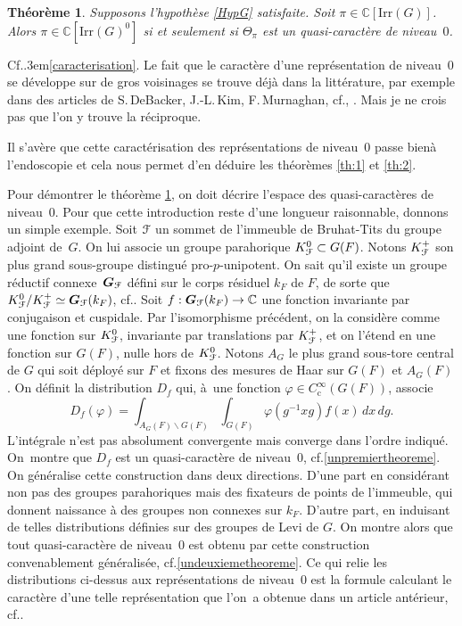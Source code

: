 \documentclass[11pt]{article}
\newcommand{\cf}{cf.\xspace}
\numberwithin{equation}{section}\providecommand{\og}{«\,}\providecommand{\fg}{\,»}
\let\mathcal \EuScript
\let\oldS\S
\renewcommand{\S}{\oldS\,}
\newcommand\Cf{Cf.\kern.3em}
\newcommand{\rc}{\mathrm{c}}
\newcommand{\Irr}{\mathrm{Irr}}
\newcommand{\bG}{\boldsymbol{G}}
\newcommand{\cF}{\mathcal{F}}
\newcommand{\CC}{\mathbb{C}}
\theoremstyle{plain}
\newtheorem{thm}{Théorème}
\theoremstyle{definition}
\begin{document}
\begin{thm}\label{th:3}
Supposons l'hypothèse \ref{HypG} satisfaite. Soit \hbox{$\pi\!\in\!\CC[\Irr(G)]$}. Alors $\pi\in \CC[\Irr(G)^0]$ si et seulement si $\Theta_{\pi}$ est un quasi-caractère de niveau~$0$.
\end{thm}

\Cf \ref{caracterisation}. Le fait que le caractère d'une représentation de niveau~$0$ se développe sur de gros voisinages se trouve déjà dans la littérature, par exemple dans des articles de S.\,DeBacker, J.-L.\,Kim, F.\,Murnaghan, \cf \cite[Th.\,3.5.2]{D}, \cite[Th.\,5.3.1]{KM}. Mais je ne crois pas que l'on y trouve la réciproque.

Il s'avère que cette caractérisation des représentations de niveau~$0$ \og passe bien\fg à l'endoscopie et cela nous permet d'en déduire les théorèmes \ref{th:1} et \ref{th:2}.

Pour démontrer le théorème \ref{th:3}, on doit décrire l'espace des quasi-caractères de niveau~$0$. Pour que cette introduction reste d'une longueur raisonnable, donnons un simple exemple. Soit $\cF$ un sommet de l'immeuble de Bruhat-Tits du groupe adjoint de~$G$. On lui associe un groupe parahorique $K_{\cF}^0\subset G(F)$. Notons $K_{\cF}^+$ son plus grand sous-groupe distingué pro-$p$-unipotent. On sait qu'il existe un groupe réductif connexe~$\bG_{\cF}$ défini sur le corps résiduel $k_{F}$ de $F$, de sorte que $K_{\cF}^0/K_{\cF}^+\simeq \bG_{\cF}(k_{F})$, \cf \cite[\S3.4]{T}. Soit $f:\bG_{\cF}(k_{F})\to \CC$ une fonction invariante par conjugaison et cuspidale. Par l'isomorphisme précédent, on la considère comme une fonction sur $K_{\cF}^0$, invariante par translations par $K_{\cF}^+$, et on l'étend en une fonction sur $G(F)$, nulle hors de $K_{\cF}^0$. Notons $A_{G}$ le plus grand sous-tore central de $G$ qui soit déployé sur $F$ et fixons des mesures de Haar sur $G(F)$ et $A_{G}(F)$. On définit la distribution $D_{f}$ qui, à~une fonction $\varphi\in C_{\rc}^{\infty}(G(F))$, associe\vspace*{-3pt}
\[
D_{f}(\varphi)=\int_{A_{G}(F)\backslash G(F)}\int_{G(F)}\varphi(g^{-1}xg)f(x)\,dx\,dg.
\]
L'intégrale n'est pas absolument convergente mais converge dans l'ordre indiqué. On~montre que $D_{f}$ est un quasi-caractère de niveau~$0$, \cf \ref{unpremiertheoreme}. On généralise cette construction dans deux directions. D'une part en considérant non pas des groupes parahoriques mais des fixateurs de points de l'immeuble, qui donnent naissance à des groupes non connexes sur $k_{F}$. D'autre part, en induisant de telles distributions définies sur des groupes de Levi de $G$. On montre alors que tout quasi-caractère de niveau~$0$ est obtenu par cette construction convenablement généralisée, \cf \ref{undeuxiemetheoreme}. Ce qui relie les distributions ci-dessus aux représentations de niveau~$0$ est la formule calculant le carac\-tère d'une telle représentation que l'on~a obtenue dans un article antérieur, \cf \cite{W2}.
\end{document}
